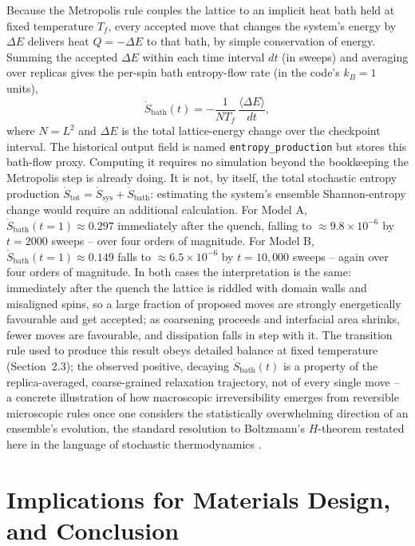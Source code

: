 \documentclass[11pt]{article}
\begin{document}
Because the Metropolis rule couples the lattice to an implicit heat bath
held at fixed temperature $T_f$, every accepted move that changes the
system's energy by $\Delta E$ delivers heat $Q = -\Delta E$ to that bath,
by simple conservation of energy. Summing the accepted $\Delta E$ within
each time interval $dt$ (in sweeps) and averaging over replicas gives the
per-spin bath entropy-flow rate (in the code's $k_B=1$ units),
\begin{equation}
\dot S_{\mathrm{bath}}(t) = -\frac{1}{N T_f}\,\frac{\langle \Delta E\rangle}{dt},
\label{eq:entropy}
\end{equation}
where $N=L^2$ and $\Delta E$ is the total lattice-energy change over the
checkpoint interval. The historical output field is named
\texttt{entropy\_production} but stores this bath-flow proxy. Computing it
requires no simulation beyond the bookkeeping the Metropolis step is
already doing. It is not, by itself, the total stochastic entropy
production $\dot S_{\mathrm{tot}}=\dot S_{\mathrm{sys}}+\dot
S_{\mathrm{bath}}$: estimating the system's ensemble Shannon-entropy change
would require an additional calculation. For Model A,
$\dot S_{\mathrm{bath}}(t{=}1)\approx0.297$ immediately
after the quench, falling to $\approx9.8\times10^{-6}$ by $t=2000$ sweeps
-- over four orders of magnitude. For Model B,
$\dot S_{\mathrm{bath}}(t{=}1)\approx0.149$
falls to $\approx6.5\times10^{-6}$ by $t=10{,}000$ sweeps -- again over
four orders of magnitude. In both cases the interpretation is the same:
immediately after the quench the lattice is riddled with domain walls and
misaligned spins, so a large fraction of proposed moves are strongly
energetically favourable and get accepted; as coarsening proceeds and
interfacial area shrinks, fewer moves are favourable, and dissipation
falls in step with it. The transition rule used to produce this result
obeys detailed balance at fixed temperature (Section~2.3); the observed
positive, decaying
$\dot S_{\mathrm{bath}}(t)$ is a property of the replica-averaged,
coarse-grained relaxation trajectory, not of every single move
-- a concrete illustration of how macroscopic irreversibility emerges
from reversible microscopic rules once one considers the statistically
overwhelming direction of an ensemble's evolution, the standard
resolution to Boltzmann's $H$-theorem \cite{Huang1987} restated here in
the language of stochastic thermodynamics \cite{Seifert2012}.

\section{Implications for Materials Design, and Conclusion}
\end{document}
